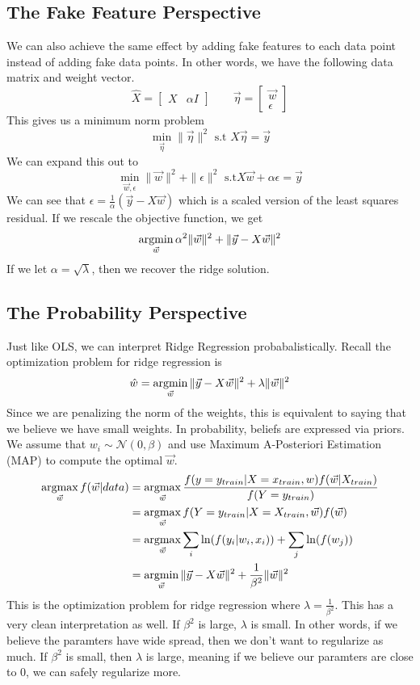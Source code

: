 \subsection{The Fake Feature Perspective}
We can also achieve the same effect by adding fake features to each data point instead of adding fake data points. In other words, we have the following data matrix and weight vector.
\[
  \hat{X} = \begin{bmatrix}
    X & \alpha I
  \end{bmatrix} \qquad \vec{\eta} = \begin{bmatrix}
    \vec{w}\\
    \epsilon
  \end{bmatrix}
\]
This gives us a minimum norm problem
$$\min_{\vec{\eta}}\|\vec{\eta}\|^2 \text{ s.t } \hat{X}\vec{\eta}=\vec{y}$$
We can expand this out to
$$\min_{\vec{w}, \epsilon}\|\vec{w}\|^2+\|\epsilon\|^2 \text{ s.t} X\vec{w}+\alpha\epsilon=\vec{y}$$
We can see that $\epsilon=\frac{1}{\alpha}(\vec{y}-X\vec{w})$ which is a scaled version of the least squares residual. If we rescale the objective function, we get
$$\operatorname*{argmin}_{\vec{w}}\alpha^2\|\vec{w}\|^2+\|\vec{y}-X\vec{w}\|^2$$
If we let $\alpha=\sqrt{\lambda}$, then we recover the ridge solution.
\subsection{The Probability Perspective}
Just like OLS, we can interpret Ridge Regression probabalistically. Recall the optimization problem for ridge regression is
\[
  \hat{w} = \operatorname*{argmin}_{\vec{w}} \|\vec{y} - X\vec{w}\|^2 + \lambda \|\vec{w}\|^2
\]
Since we are penalizing the norm of the weights, this is equivalent to saying that we believe we have small weights. In probability, beliefs are expressed via priors. We assume that $w_i\sim\mathcal{N}(0, \beta)$ and use Maximum A-Posteriori Estimation (MAP) to compute the optimal $\vec{w}$.
\begin{align*}
  \operatorname*{argmax}_{\vec{w}}f(\vec{w}|data) &= \operatorname*{argmax}_{\vec{w}}\frac{f(y=y_{train}|X=x_{train}, w)f(\vec{w}|X_{train})}{f(Y=y_{train})}\\
  &= \operatorname*{argmax}_{\vec{w}} f(Y=y_{train}|X=X_{train}, \vec{w})f(\vec{w})\\
  &= \operatorname*{argmax}_{\vec{w}}\sum_i\ln(f(y_i|w_i, x_i))+\sum_j\ln(f(w_j))\\
    &= \operatorname*{argmin}_{\vec{w}} \|\vec{y}-X\vec{w}\|^2+\frac{1}{\beta^2}\|\vec{w}\|^2
\end{align*}
This is the optimization problem for ridge regression where $\lambda=\frac{1}{\beta^2}$. This has a very clean interpretation as well. If $\beta^2$ is large, $\lambda$ is small. In other words, if we believe the paramters have wide spread, then we don't want to regularize as much. If $\beta^2$ is small, then $\lambda$ is large, meaning if we believe our paramters are close to 0, we can safely regularize more.
